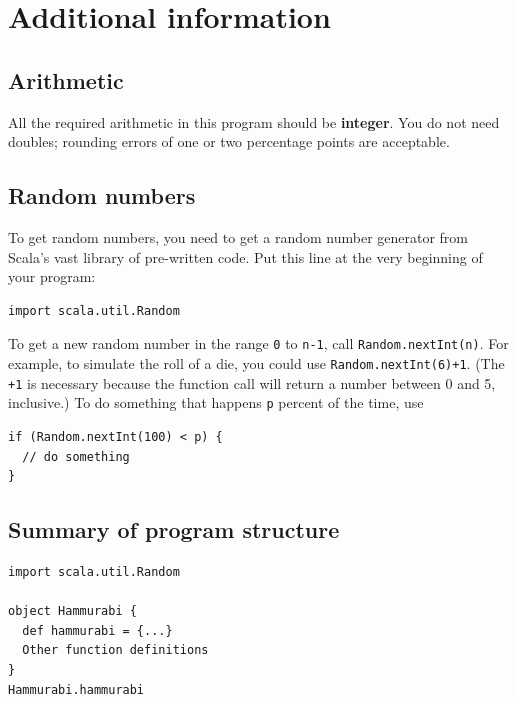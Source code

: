\documentclass[12pt,a4paper,times]{article}
\begin{document}
\section{Additional information}\label{additional-information}

\subsection{Arithmetic}\label{arithmetic}

All the required arithmetic in this program should be \textbf{integer}.
You do not need doubles; rounding errors of one or two percentage points
are acceptable.

\subsection{Random numbers}\label{random-numbers}

To get random numbers, you need to get a random number generator from
Scala's vast library of pre-written code. Put this line at the very
beginning of your program:
\begin{Verbatim}
import scala.util.Random
\end{Verbatim}
To get a new random number in the range \texttt{0} to \texttt{n-1}, call
\texttt{Random.nextInt(n)}. For example, to simulate the roll of a die,
you could use \texttt{Random.nextInt(6)+1}. (The \texttt{+1} is
necessary because the function call will return a number between 0 and
5, inclusive.) To do something that happens \texttt{p} percent of the
time, use
\begin{Verbatim}
if (Random.nextInt(100) < p) { 
  // do something
}
\end{Verbatim}

\subsection{Summary of program structure}\label{summary-of-program-structure}

\begin{Verbatim}
import scala.util.Random

object Hammurabi {
  def hammurabi = {...}
  Other function definitions
}
Hammurabi.hammurabi
\end{Verbatim}
\end{document}

